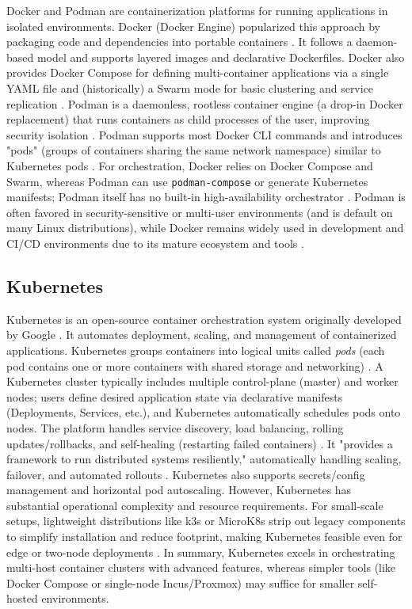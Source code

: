 Docker and Podman are containerization platforms for running applications in isolated environments. Docker (Docker Engine) popularized this approach by packaging code and dependencies into portable containers \cite{spacelift-podman-docker-2024}. It follows a daemon-based model and supports layered images and declarative Dockerfiles. Docker also provides Docker Compose for defining multi-container applications via a single YAML file and (historically) a Swarm mode for basic clustering and service replication . Podman is a daemonless, rootless container engine (a drop-in Docker replacement) that runs containers as child processes of the user, improving security isolation . Podman supports most Docker CLI commands and introduces "pods" (groups of containers sharing the same network namespace) similar to Kubernetes pods . For orchestration, Docker relies on Docker Compose and Swarm, whereas Podman can use \texttt{podman-compose} or generate Kubernetes manifests; Podman itself has no built-in high-availability orchestrator . Podman is often favored in security-sensitive or multi-user environments (and is default on many Linux distributions), while Docker remains widely used in development and CI/CD environments due to its mature ecosystem and tools .

\subsection*{Kubernetes}

Kubernetes is an open-source container orchestration system originally developed by Google \cite{kubernetes-docs-2025}. It automates deployment, scaling, and management of containerized applications. Kubernetes groups containers into logical units called \emph{pods} (each pod contains one or more containers with shared storage and networking) . A Kubernetes cluster typically includes multiple control-plane (master) and worker nodes; users define desired application state via declarative manifests (Deployments, Services, etc.), and Kubernetes automatically schedules pods onto nodes. The platform handles service discovery, load balancing, rolling updates/rollbacks, and self-healing (restarting failed containers) . It "provides a framework to run distributed systems resiliently," automatically handling scaling, failover, and automated rollouts . Kubernetes also supports secrets/config management and horizontal pod autoscaling. However, Kubernetes has substantial operational complexity and resource requirements. For small-scale setups, lightweight distributions like k3s or MicroK8s strip out legacy components to simplify installation and reduce footprint, making Kubernetes feasible even for edge or two-node deployments \cite{k3s-microk8s-2022}. In summary, Kubernetes excels in orchestrating multi-host container clusters with advanced features, whereas simpler tools (like Docker Compose or single-node Incus/Proxmox) may suffice for smaller self-hosted environments.


